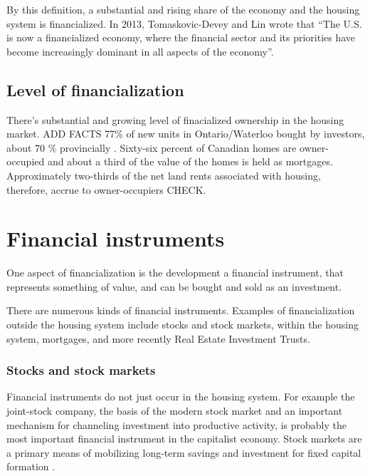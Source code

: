By this definition, a substantial and rising share of the economy and the housing system is financialized. 
In 2013, Tomaskovic-Devey and Lin wrote that ``The U.S. is now a financialized economy, where the financial sector and its priorities have become increasingly dominant in all aspects of the economy''\cite{tomaskovic-3}. 

\subsection{Level of financialization}
There's substantial and growing level of finacialized ownership in the housing market.
ADD FACTS 77\% of new units in Ontario/Waterloo bought by investors, about 70 \% provincially \cite{}.
Sixty-six percent of Canadian homes are owner-occupied and about a third of the value of the homes is held as mortgages. Approximately two-thirds of the net land rents associated with housing, therefore, accrue to owner-occupiers \cite{nemtinFinancializationHousingSocial2021} CHECK. %

\section{Financial instruments} \label{section-financial-instruments}
One aspect of financialization is the development  
a \gls{financial instrument}, that represents something of value, and can be bought and sold as an investment.

There are numerous kinds of financial instruments. Examples of financialization outside the housing system include stocks and stock markets, within the housing system, mortgages, and more recently Real Estate Investment Trusts.

\subsubsection{Stocks and stock markets}
Financial instruments do not just occur in the housing system. 
For example the \gls{joint-stock company}, the basis of the modern stock market and an important mechanism for channeling investment into productive activity,  is probably the most important financial instrument in the capitalist economy.  Stock markets are %
a primary means of %
mobilizing long-term savings and investment for fixed capital formation \cite{azfarMarketMobilizedCapital2003}.  

